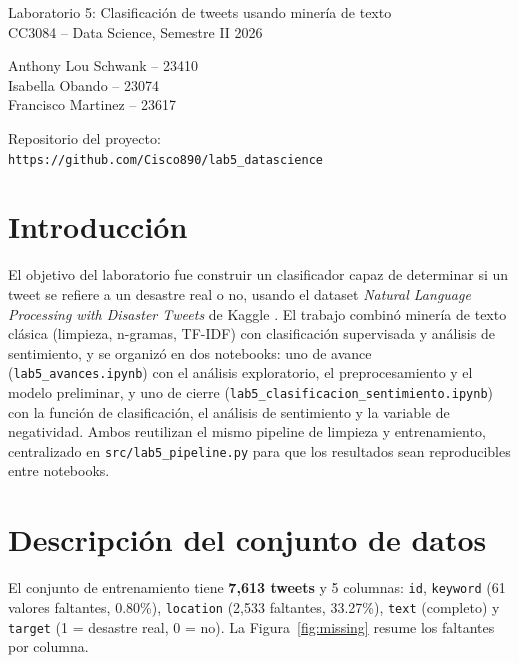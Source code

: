 \documentclass[11pt]{article}
\begin{document}
\begin{center}
{\LARGE Laboratorio 5: Clasificaci\'on de tweets usando miner\'ia de texto}\\[4pt]
{\large CC3084 -- Data Science, Semestre II 2026}
\end{center}

\vspace{0.8cm}

\begin{center}
Anthony Lou Schwank -- 23410 \\
Isabella Obando -- 23074 \\
Francisco Martinez -- 23617
\end{center}

\vspace{0.5cm}

\begin{center}
Repositorio del proyecto:\\
\texttt{https://github.com/Cisco890/lab5\_datascience}
\end{center}

\vspace{0.5cm}

\section{Introducci\'on}

El objetivo del laboratorio fue construir un clasificador capaz de determinar si un
tweet se refiere a un desastre real o no, usando el dataset \emph{Natural Language
Processing with Disaster Tweets} de Kaggle \cite{kaggle_disaster_tweets}. El trabajo
combin\'o miner\'ia de texto cl\'asica (limpieza, n-gramas, TF-IDF) con clasificaci\'on
supervisada y an\'alisis de sentimiento, y se organiz\'o en dos notebooks: uno de
avance (\texttt{lab5\_avances.ipynb}) con el an\'alisis exploratorio, el
preprocesamiento y el modelo preliminar, y uno de cierre
(\texttt{lab5\_clasificacion\_sentimiento.ipynb}) con la funci\'on de clasificaci\'on,
el an\'alisis de sentimiento y la variable de negatividad. Ambos reutilizan el mismo
pipeline de limpieza y entrenamiento, centralizado en \texttt{src/lab5\_pipeline.py}
para que los resultados sean reproducibles entre notebooks.

\section{Descripci\'on del conjunto de datos}

El conjunto de entrenamiento tiene \textbf{7{,}613 tweets} y 5 columnas: \texttt{id},
\texttt{keyword} (61 valores faltantes, 0.80\%), \texttt{location} (2{,}533 faltantes,
33.27\%), \texttt{text} (completo) y \texttt{target} (1 = desastre real, 0 = no). La
Figura~\ref{fig:missing} resume los faltantes por columna.
\end{document}
